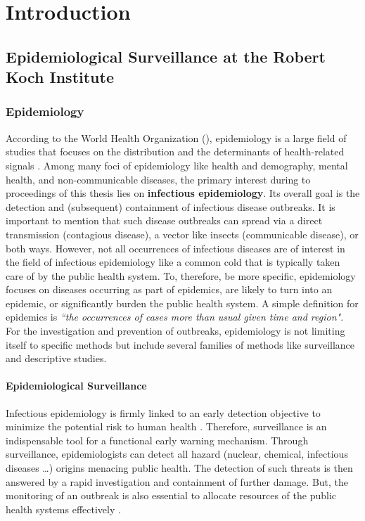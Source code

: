 \chapter{Introduction}

\section{Epidemiological Surveillance at the Robert Koch Institute}

\subsection{Epidemiology}
According to the World Health Organization (), epidemiology is a large field of studies that focuses on the distribution and the determinants of health-related signals \citep{WHOepi}.
Among many foci of epidemiology like health and demography, mental health, and non-communicable diseases, the primary interest during to proceedings of this thesis lies on \textbf{infectious epidemiology}.
Its overall goal is the detection and (subsequent) containment of infectious disease outbreaks.
It is important to mention that such disease outbreaks can spread via a direct transmission (contagious disease), a vector like insects (communicable disease), or both ways.
However, not all occurrences of infectious diseases are of interest in the field of infectious epidemiology like a common cold that is typically taken care of by the public health system.
To, therefore, be more specific, epidemiology focuses on diseases occurring as part of epidemics, are likely to turn into an epidemic, or significantly burden the public health system.
A simple definition for epidemics is \textit{``the occurrences of cases more than usual given time and region"}.
For the investigation and prevention of outbreaks, epidemiology is not limiting itself to specific methods but include several families of methods like surveillance and descriptive studies.


\subsubsection{Epidemiological Surveillance}
Infectious epidemiology is firmly linked to an early detection objective to minimize the potential risk to human health \citep{EarlyDetection}.
Therefore, surveillance is an indispensable tool for a functional early warning mechanism.
Through surveillance, epidemiologists can detect all hazard (nuclear, chemical, infectious diseases \ldots) origins menacing public health.
The detection of such threats is then answered by a rapid investigation and containment of further damage.
But, the monitoring of an outbreak is also essential to allocate resources of the public health systems effectively \citep{EarlyDetection}.

